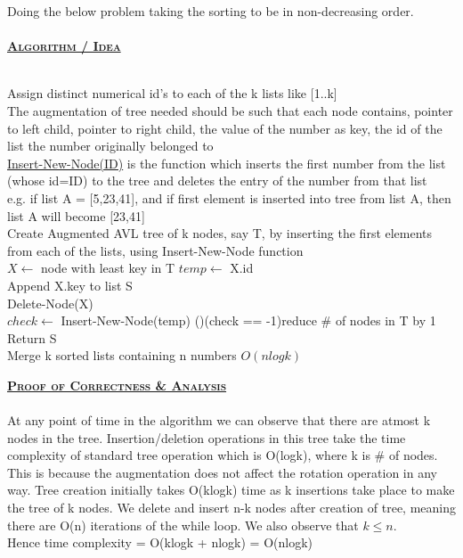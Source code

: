 \documentclass[a4 paper]{article}
\begin{document}

Doing the below problem taking the sorting to be in non-decreasing order.\\\\
\textbf{\underline{\textsc{Algorithm / Idea}}}\\\\
\begin{algorithm}[H]
\SetAlgoLined
{}
Assign distinct numerical id's to each of the k lists like [1..k]\\
The augmentation of tree needed should be such that each node contains, pointer to left child, pointer to right child, the value of the number as key, the id of the list the number originally belonged to\\
\underline{Insert-New-Node(ID)} is the function which inserts the first number from the list (whose id=ID) to the tree and deletes the entry of the number from that list\\
e.g. if list A = [5,23,41], and if first element is inserted into tree from list A, then list A will become [23,41]\\
Create Augmented AVL tree of k nodes, say T, by inserting the first elements from each of the lists, using Insert-New-Node function\\
{
    $X \leftarrow$ node with least key in T
    $temp \leftarrow$ X.id\\
    Append X.key to list S\\
    Delete-Node(X)\\
    $check \leftarrow$ Insert-New-Node(temp)
    \If(){(check == -1)}{reduce \# of nodes in T by 1}
}
Return S\\
\caption{Merge k sorted lists containing n numbers $O(nlogk)$}
\end{algorithm}
\vspace{4mm}
\textbf{\underline{\textsc{Proof of Correctness \& Analysis}}}\\\\
At any point of time in the algorithm we can observe that there are atmost k nodes in the tree. Insertion/deletion operations in this tree take the time complexity of standard tree operation which is O(logk), where k is \# of nodes. This is because the augmentation does not affect the rotation operation in any way. Tree creation initially takes O(klogk) time as k insertions take place to make the tree of k nodes. We delete and insert n-k nodes after creation of tree, meaning there are O(n) iterations of the while loop. We also observe that $k \leq n$.\\ Hence time complexity = O(klogk + nlogk) = O(nlogk)\\
\end{document}
